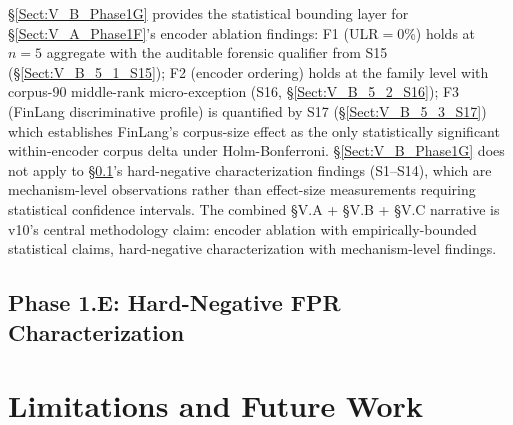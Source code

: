 \documentclass[journal]{IEEEtran}
\begin{document}
\S\ref{Sect:V_B_Phase1G} provides the statistical bounding layer for \S\ref{Sect:V_A_Phase1F}'s encoder ablation findings: F1 (ULR$={}$0\%) holds at $n{=}5$ aggregate with the auditable forensic qualifier from S15 (\S\ref{Sect:V_B_5_1_S15}); F2 (encoder ordering) holds at the family level with corpus-90 middle-rank micro-exception (S16, \S\ref{Sect:V_B_5_2_S16}); F3 (FinLang discriminative profile) is quantified by S17 (\S\ref{Sect:V_B_5_3_S17}) which establishes FinLang's corpus-size effect as the only statistically significant within-encoder corpus delta under Holm-Bonferroni. \S\ref{Sect:V_B_Phase1G} does not apply to \S\ref{Sect:V_C_Phase1E}'s hard-negative characterization findings (S1--S14), which are mechanism-level observations rather than effect-size measurements requiring statistical confidence intervals. The combined \S V.A + \S V.B + \S V.C narrative is v10's central methodology claim: encoder ablation with empirically-bounded statistical claims, hard-negative characterization with mechanism-level findings.

\subsection{Phase 1.E: Hard-Negative FPR Characterization}
\label{Sect:V_C_Phase1E}



\section{Limitations and Future Work}
\label{Sect:VI_Limitations}


\end{document}
